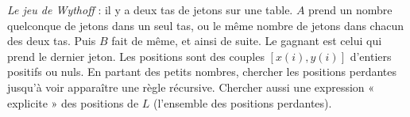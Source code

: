 \emph{Le jeu de Wythoff} : il y a deux tas de jetons sur une table. $A$ prend un nombre quelconque de jetons dans un seul tas, ou le même nombre de jetons dans chacun des deux tas. Puis $B$ fait de même, et ainsi de suite. Le gagnant est celui qui prend le dernier jeton. Les positions sont des couples $[x(i), y(i)]$ d'entiers positifs ou nuls. En partant des petits nombres, chercher les positions perdantes jusqu'à voir apparaître une règle récursive. Chercher aussi une expression « explicite » des positions de $L$ (l'ensemble des positions perdantes).
